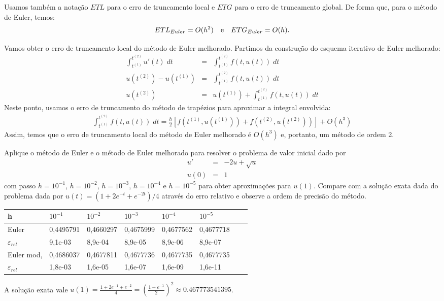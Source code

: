 Usamos também a notação $ETL$ para o erro de truncamento local e $ETG$ para o erro de truncamento global. De forma que, para o método de Euler, temos:
$$ETL_{Euler} = O(h^2) ~~~ \hbox{e} ~~~ ETG_{Euler}=O(h).$$
\begin{ex} Vamos obter o erro de truncamento local do método de Euler melhorado.
Partimos da construção do esquema iterativo de Euler melhorado:
\begin{eqnarray}
  \int_{t^{(1)}}^{t^{(2)}} u'(t) \;dt &=& \int_{t^{(1)}}^{t^{(2)}} f(t,u(t)) \; dt\\
  u(t^{(2)})-u(t^{(1)})               &=& \int_{t^{(1)}}^{t^{(2)}} f(t,u(t)) \; dt\\
  u(t^{(2)})                      &=& u(t^{(1)}) +  \int _{t^{(1)}}^{t^{(2)}} f(t,u(t)) \; dt
\end{eqnarray}
Neste ponto, usamos o erro de truncamento do método de trapézios para aproximar a integral envolvida:
\begin{eqnarray*}
\int _{t^{(1)}}^{t^{(2)}} f(t,u(t)) \; dt = \frac{h}{2}\left[f\left(t^{(1)},u(t^{(1)})\right) + f\left(t^{(2)},u(t^{(2)})\right)\right] + O(h^3)
\end{eqnarray*}
Assim, temos que o erro de truncamento local do método de Euler melhorado é $O(h^3)$ e, portanto, um método de ordem 2.
\end{ex}

\begin{exer}Aplique o método de Euler e o método de Euler melhorado para resolver o problema de valor inicial dado por
\begin{eqnarray*}
u'&=& -2u + \sqrt{u}\\
u(0)&=&1
\end{eqnarray*}
com passo $h=10^{-1}$, $h=10^{-2}$, $h=10^{-3}$, $h=10^{-4}$ e $h=10^{-5}$ para obter aproximações para $u(1)$. Compare com a solução exata dada do problema dada por $u(t) =  \left({1+2 e^{-t}+e^{-2 t}}\right)/{4}$ através do erro relativo e observe a ordem de precisão do método.
\end{exer}
\begin{resp}

\begin{center}
 \begin{tabular}{|l|l|l|l|l|l|l|l|}%
\hline
   h&$10^{-1}$&$10^{-2}$&$10^{-3}$&$10^{-4}$&$10^{-5}$\\
   \hline
   Euler & 0,4495791 & 0,4660297 & 0,4675999 & 0,4677562 & 0,4677718\\
   \hline
   $\varepsilon_{rel}$ &9,1e-03 &  8,9e-04  & 8,9e-05&   8,9e-06 &  8,9e-07\\
   \hline
  Euler mod, & 0,4686037 & 0,4677811 & 0,4677736 & 0,4677735 & 0,4677735\\
   \hline
   $\varepsilon_{rel}$ & 1,8e-03 & 1,6e-05 & 1,6e-07 & 1,6e-09 & 1,6e-11\\
   \hline
   \end{tabular}
\end{center}
A solução exata vale $u(1)=\frac{1+2e^{-1}+e^{-2}}{4}= \left(\frac{1+e^{-1}}{2}\right)^2\approx 0.467773541395$.
\end{resp}


